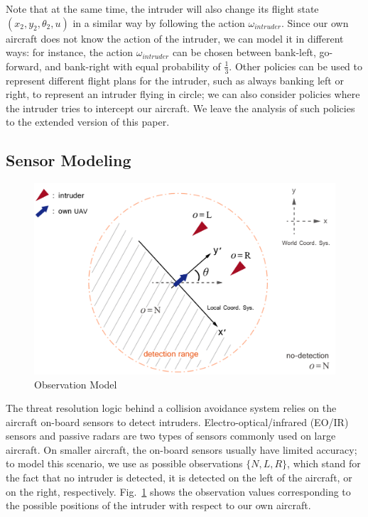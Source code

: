 \documentclass[orivec]{llncs}
\begin{document}
Note that at the same time, the intruder will also change its flight state $(x_{2}, y_{2}, \theta_{2}, u)$ in a similar way by following the action $\omega_{\mathit{intruder}}$.
Since our own aircraft does not know the action of the intruder, we can model it in different ways:
for instance, the action $\omega_{\mathit{intruder}}$ can be chosen between bank-left, go-forward, and bank-right with equal probability of $\frac{1}{3}$.
Other policies can be used to represent different flight plans for the intruder, such as always banking left or right, to represent an intruder flying in circle;
we can also consider policies where the intruder tries to intercept our aircraft.
We leave the analysis of such policies to the extended version of this paper.



\subsection{Sensor Modeling}
\label{ssec:sensorModeling}

\begin{figure}[t]
	\centering
	\includegraphics[width=0.7\linewidth]{observationModel}
	\caption{Observation Model}
	\label{fig:observationModel}
\end{figure}
The threat resolution logic behind a collision avoidance system relies on the aircraft on-board sensors to detect intruders.
Electro-optical/infrared (EO/IR) sensors and passive radars are two types of sensors commonly used on large aircraft.
On smaller aircraft, the on-board sensors usually have limited accuracy;
to model this scenario, we use as possible observations $\{N, L, R\}$, which stand for the fact that no intruder is detected, it is detected on the left of the aircraft, or on the right, respectively. 
Fig.~\ref{fig:observationModel} shows the observation values corresponding to the possible positions of the intruder with respect to our own aircraft.
\end{document}
